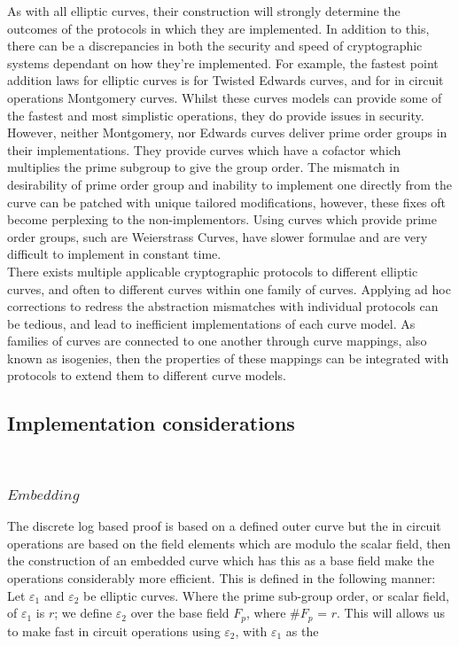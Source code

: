 \documentclass{article}
\begin{document}
As with all elliptic curves, their construction will strongly determine the outcomes of the protocols in which they are implemented. In addition to this, there can be a discrepancies in both the security and speed of cryptographic systems dependant on how they're implemented. For example, the fastest point addition laws for elliptic curves is for Twisted Edwards curves, and for in circuit operations Montgomery curves. Whilst these curves models can provide some of the fastest and most simplistic operations, they do provide issues in security. However, neither Montgomery, nor Edwards curves deliver prime order groups in their implementations. They provide curves which have a cofactor which multiplies the prime subgroup to give the group order. The mismatch in desirability of prime order group and inability to implement one directly from the curve can be patched with unique tailored modifications, however, these fixes oft become perplexing to the non-implementors. Using curves which provide prime order groups, such are Weierstrass Curves, have slower formulae and are very difficult to implement in constant time. \\ 

There exists multiple applicable cryptographic protocols to different elliptic curves, and often to different curves within one family of curves. Applying ad hoc corrections to redress the abstraction mismatches with individual protocols can be tedious, and lead to inefficient implementations of each curve model. As families of curves are connected to one another through curve mappings, also known as isogenies, then the properties of these mappings can be integrated with protocols to extend them to different curve models.




\subsection{Implementation considerations}
\\ \subsubsection{$Embedding$}
The discrete log based proof is based on a defined outer curve but the in circuit operations are based on the field elements which are modulo the scalar field, then the construction of an embedded curve which has this as a base field make the operations considerably more efficient. This is defined in the following manner: Let $\varepsilon_{1}$ and $\varepsilon_{2}$ be elliptic curves. Where the prime sub-group order, or scalar field, of $\varepsilon_{1}$ is $r$; we define $\varepsilon_{2}$ over the base field $F_p$, where \#$F_p$ = $r$.
This will allows us to make fast in circuit operations using $\varepsilon_{2}$, with  $\varepsilon_{1}$ as the 
\end{document}
